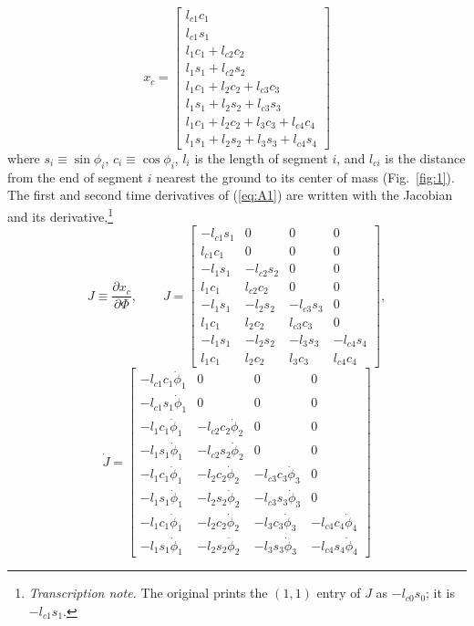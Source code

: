 \documentclass[11pt]{article}
\newcommand{\tnote}[1]{\footnote{\textit{Transcription note.} #1}}
\begin{document}
\begin{equation}
x_c = \begin{bmatrix}
l_{c1}c_1\\
l_{c1}s_1\\
l_1c_1 + l_{c2}c_2\\
l_1s_1 + l_{c2}s_2\\
l_1c_1 + l_2c_2 + l_{c3}c_3\\
l_1s_1 + l_2s_2 + l_{c3}s_3\\
l_1c_1 + l_2c_2 + l_3c_3 + l_{c4}c_4\\
l_1s_1 + l_2s_2 + l_3s_3 + l_{c4}s_4
\end{bmatrix}
\label{eq:A1}
\end{equation}
where $s_i\equiv\sin\phi_i$, $c_i\equiv\cos\phi_i$, $l_i$ is the length of
segment $i$, and $l_{ci}$ is the distance from the end of segment $i$ nearest
the ground to its center of mass (Fig.~\ref{fig:1}). The first and second time
derivatives of (\ref{eq:A1}) are written with the Jacobian and its
derivative,\tnote{The original prints the $(1,1)$ entry of $J$ as
$-l_{c0}s_0$; it is $-l_{c1}s_1$.}
\[
J \equiv \frac{\partial x_c}{\partial\Phi}, \qquad
J = \begin{bmatrix}
-l_{c1}s_1 & 0 & 0 & 0\\
l_{c1}c_1 & 0 & 0 & 0\\
-l_1s_1 & -l_{c2}s_2 & 0 & 0\\
l_1c_1 & l_{c2}c_2 & 0 & 0\\
-l_1s_1 & -l_2s_2 & -l_{c3}s_3 & 0\\
l_1c_1 & l_2c_2 & l_{c3}c_3 & 0\\
-l_1s_1 & -l_2s_2 & -l_3s_3 & -l_{c4}s_4\\
l_1c_1 & l_2c_2 & l_3c_3 & l_{c4}c_4
\end{bmatrix},
\]
\[
\dot{J} = \begin{bmatrix}
-l_{c1}c_1\dot{\phi}_1 & 0 & 0 & 0\\
-l_{c1}s_1\dot{\phi}_1 & 0 & 0 & 0\\
-l_1c_1\dot{\phi}_1 & -l_{c2}c_2\dot{\phi}_2 & 0 & 0\\
-l_1s_1\dot{\phi}_1 & -l_{c2}s_2\dot{\phi}_2 & 0 & 0\\
-l_1c_1\dot{\phi}_1 & -l_2c_2\dot{\phi}_2 & -l_{c3}c_3\dot{\phi}_3 & 0\\
-l_1s_1\dot{\phi}_1 & -l_2s_2\dot{\phi}_2 & -l_{c3}s_3\dot{\phi}_3 & 0\\
-l_1c_1\dot{\phi}_1 & -l_2c_2\dot{\phi}_2 & -l_3c_3\dot{\phi}_3
& -l_{c4}c_4\dot{\phi}_4\\
-l_1s_1\dot{\phi}_1 & -l_2s_2\dot{\phi}_2 & -l_3s_3\dot{\phi}_3
& -l_{c4}s_4\dot{\phi}_4
\end{bmatrix}
\]
\end{document}
